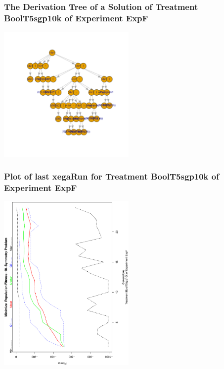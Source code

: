 \documentclass[18pt,c]{beamer}
\begin{document}
 \begin{frame}
 \frametitle{ The Derivation Tree of a Solution of Treatment BoolT5sgp10k of Experiment ExpF }
 \begin{center}
\includegraphics[width=0.5\textwidth, angle=0]
{ExpFDerivationTreeFigure000.pdf}
 \end{center}
 \label{report/ExpFDerivationTreeFigure000.pdf}  
 \end{frame}

 \begin{frame}
 \frametitle{ Plot of last xegaRun for Treatment BoolT5sgp10k of Experiment ExpF }
 \begin{center}
\includegraphics[width=0.5\textwidth, angle=-90]
{ExpFPlotPopStatsFigure000.eps}
 \end{center}
 \label{report/ExpFPlotPopStatsFigure000.eps}  
 \end{frame}
\end{document}
